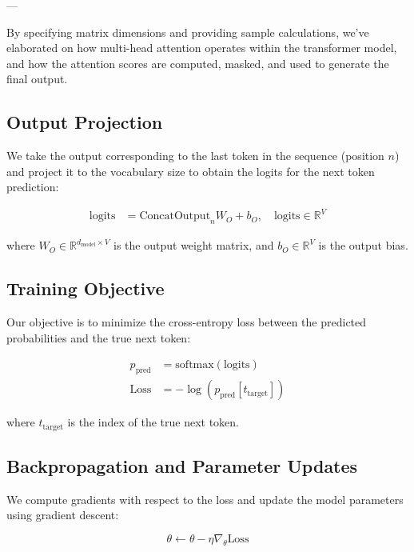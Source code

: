 \documentclass{article}
\begin{document}
---

By specifying matrix dimensions and providing sample calculations, we've elaborated on how multi-head attention operates within the transformer model, and how the attention scores are computed, masked, and used to generate the final output.


\subsection{Output Projection}

We take the output corresponding to the last token in the sequence (position \( n \)) and project it to the vocabulary size to obtain the logits for the next token prediction:

\begin{align*}
    \text{logits} &= \text{ConcatOutput}_{n} W_O + b_O, \quad \text{logits} \in \mathbb{R}^{V}
\end{align*}

where \( W_O \in \mathbb{R}^{d_{\text{model}} \times V} \) is the output weight matrix, and \( b_O \in \mathbb{R}^{V} \) is the output bias.

\subsection{Training Objective}

Our objective is to minimize the cross-entropy loss between the predicted probabilities and the true next token:

\begin{align*}
    p_{\text{pred}} &= \text{softmax}(\text{logits}) \\
    \text{Loss} &= -\log(p_{\text{pred}}[t_{\text{target}}])
\end{align*}

where \( t_{\text{target}} \) is the index of the true next token.

\subsection{Backpropagation and Parameter Updates}

We compute gradients with respect to the loss and update the model parameters using gradient descent:

\begin{equation}
    \theta \leftarrow \theta - \eta \nabla_\theta \text{Loss}
\end{equation}
\end{document}
